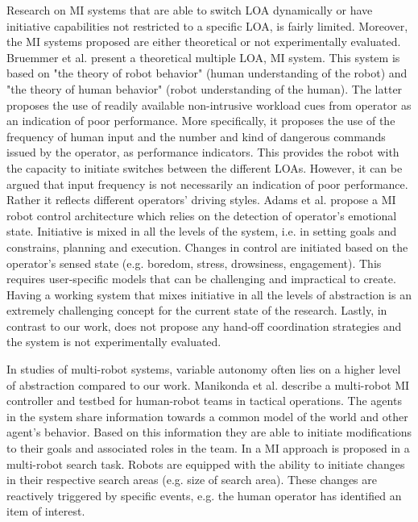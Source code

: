 \documentclass[a4paper,12pt,oneside,openright]{bhamthesis}
\begin{document}
Research on MI systems that are able to switch LOA dynamically or have initiative capabilities not restricted to a specific LOA, is fairly limited. Moreover, the MI systems proposed are either theoretical or not experimentally evaluated.  Bruemmer et al. \citep{Bruemmer2003b} present a theoretical multiple LOA, MI system. This system is based on "the theory of robot behavior" (human understanding of the robot) and  "the theory of human behavior" (robot understanding of the human). The latter proposes the use of readily available non-intrusive workload cues from operator as an indication of poor performance. More specifically, it proposes the use of the frequency of human input and the number and kind of dangerous commands issued by the operator, as performance indicators. This provides the robot with the capacity to initiate switches between the different LOAs. However, it can be argued that input frequency is not necessarily an indication of poor performance. Rather it reflects different operators' driving styles. Adams et al. \citep{Adams2004} propose a MI robot control architecture which relies on the detection of operator's emotional state. Initiative is mixed in all the levels of the system, i.e. in setting goals and constrains, planning and execution. Changes in control are initiated based on the operator's sensed state (e.g. boredom, stress, drowsiness, engagement). This requires user-specific models that can be challenging and impractical to create. Having a working system that mixes initiative in all the levels of abstraction is an extremely challenging concept for the current state of the research. Lastly, in contrast to our work, \citep{Adams2004} does not propose any hand-off coordination strategies and the system is not experimentally evaluated.

In studies of multi-robot systems, variable autonomy often lies on a higher level of abstraction compared to our work. Manikonda et al. \citep{Manikonda2007} describe a multi-robot MI controller and testbed for human-robot teams in tactical operations. The agents in the system share information towards a common model of the world and other agent's behavior. Based on this information they are able to initiate modifications to their goals and associated roles in the team. In \citep{Hardin2009} a MI approach is proposed in a multi-robot search task. Robots are equipped with the ability to initiate changes in their respective search areas (e.g. size of search area). These changes are reactively triggered by specific events, e.g. the human operator has identified an item of interest.
\end{document}
